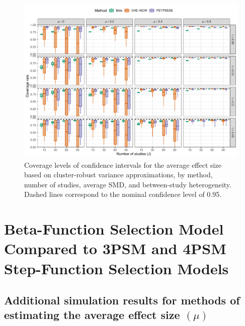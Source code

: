 \documentclass[
]{article}
\begin{document}
\begin{figure}
\includegraphics{appendix-simulation-results_files/figure-latex/comparison-coverage-full-main-1} \caption{Coverage levels of confidence intervals for the average effect size based on cluster-robust variance approximations, by method, number of studies, average SMD, and between-study heterogeneity. Dashed lines correspond to the nominal confidence level of 0.95.}\label{fig:comparison-coverage-full-main}
\end{figure}

\section{Beta-Function Selection Model Compared to 3PSM and 4PSM
Step-Function Selection
Models}\label{beta-function-selection-model-compared-to-3psm-and-4psm-step-function-selection-models}

\subsection{\texorpdfstring{Additional simulation results for methods of
estimating the average effect size
\((\mu)\)}{Additional simulation results for methods of estimating the average effect size (\textbackslash mu)}}\label{mu-simulation-results-miss}
\end{document}
